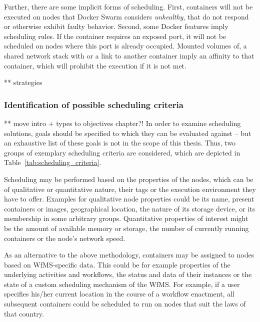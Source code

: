     Further, there are some implicit forms of scheduling. First, containers will not be executed on nodes that Docker Swarm considers \emph{unhealthy}, \ie that do not respond or otherwise exhibit faulty behavior. Second, some Docker features imply scheduling rules. If the container requires an exposed port, it will not be scheduled on nodes where this port is already occupied. Mounted volumes of, a shared network stack with or a link to another container imply an affinity to that container, which will prohibit the execution if it is not met.

    ** strategies

  \subsubsection{Identification of possible scheduling criteria} %
  \label{ssub:identification_of_desired_scheduling_criteria}

    ** move intro + types to objectives chapter?!
    In order to examine scheduling solutions, goals should be specified to which they can be evaluated against -- but an exhaustive list of these goals is not in the scope of this thesis. Thus, two groups of exemplary scheduling criteria are considered, which are depicted in Table~\ref{tab:scheduling_criteria}.

    Scheduling may be performed based on the properties of the nodes, which can be of qualitative or quantitative nature, their tags or the execution environment they have to offer. Examples for qualitative node properties could be its name, present containers or images, geographical location, the nature of its storage device, or its membership in some arbitrary groups. Quantitative properties of interest might be the amount of available memory or storage, the number of currently running containers or the node's network speed.

    As an alternative to the above methodology, containers may be assigned to nodes based on \ac{WfMS}-specific data. This could be for example properties of the underlying activities and workflows, the status and data of their instances or the state of a custom scheduling mechanism of the \ac{WfMS}. For example, if a user specifies his/her current location in the course of a workflow enactment, all subsequent containers could be scheduled to run on nodes that suit the laws of that country.

